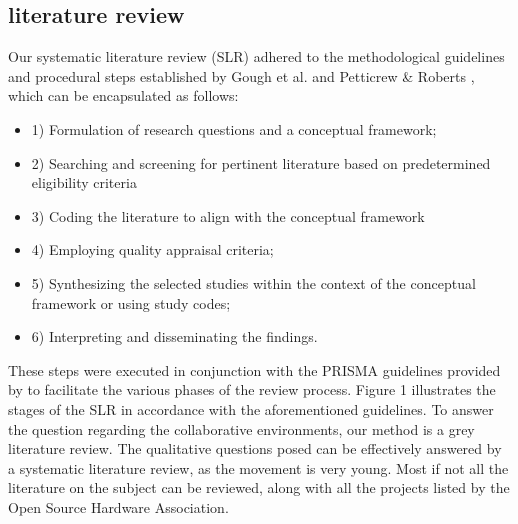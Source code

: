 \subsection{literature review}
Our systematic literature review (SLR) adhered to the methodological guidelines and procedural steps established by Gough et al.\cite{gough2017introduction} and Petticrew & Roberts \cite{petticrew2008systematic}, which can be encapsulated as follows:
\begin{itemize}
    \item 1) Formulation of research questions and a conceptual framework; 
    \item 2) Searching and screening for pertinent literature based on predetermined eligibility criteria
    \item 3) Coding the literature to align with the conceptual framework
    \item 4) Employing quality appraisal criteria;
    \item 5) Synthesizing the selected studies within the context of the conceptual framework or using study codes;
    \item 6) Interpreting and disseminating the findings. 
\end{itemize}
These steps were executed in conjunction with the PRISMA guidelines provided by \cite{page2021prisma} to facilitate the various phases of the review process. 
Figure 1 illustrates the stages of the SLR in accordance with the aforementioned guidelines.
To answer the question regarding the collaborative environments, our method is a grey literature review. 
The qualitative questions posed can be effectively answered by a systematic literature review, as the movement is very young. 
Most if not all the literature on the subject can be reviewed, along with all the projects listed by the Open Source Hardware Association.


